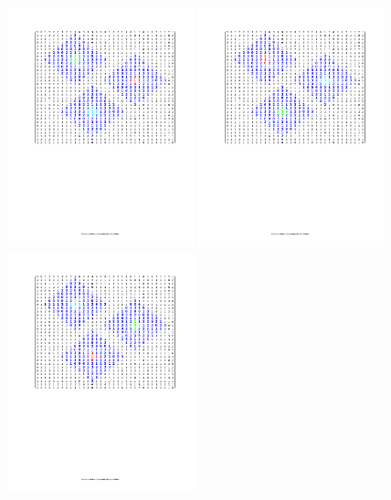 \documentclass[12pt]{iopart}
\begin{document}
\begin{figure}
    \begin{center}
\includegraphics[width=0.48\textwidth]{AKSs7ThreeDiamondsM1}
\includegraphics[width=0.48\textwidth]{AKSs7ThreeDiamondsM2}~\hspace{0.3cm}%
\includegraphics[width=0.48\textwidth]{AKSs7ThreeDiamondsM3}

\end{center}
\end{figure}
\end{document}
